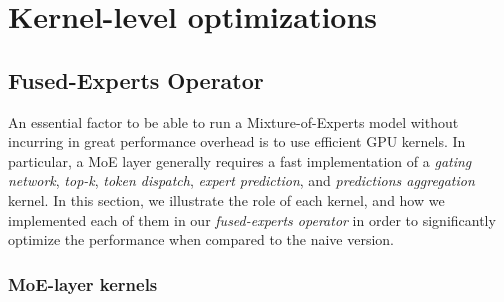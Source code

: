 
\chapter{Kernel-level optimizations}\label{chapter-8}

\section{Fused-Experts Operator}
An essential factor to be able to run a Mixture-of-Experts model without incurring in great performance overhead is to use efficient GPU kernels. In particular, a MoE layer generally requires a fast implementation of a \textit{gating network}, \textit{top-k}, \textit{token dispatch}, \textit{expert prediction}, and \textit{predictions aggregation} kernel. In this section, we illustrate the role of each kernel, and how we implemented each of them in our \textit{fused-experts operator} in order to significantly optimize the performance when compared to the naive version.

\subsection{MoE-layer kernels}

\renewcommand{\algorithmicrequire}{\textbf{Require：}\unskip}
\renewcommand{\algorithmicensure}{\textbf{Input：}\unskip}
\renewcommand{\algorithmiccomment}[1]{\hfill$\vartriangleright${\color{commentcolor}{\textit{#1}}}}

